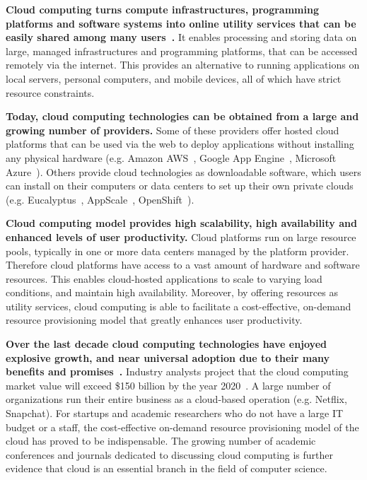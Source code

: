 \textbf{Cloud computing turns compute infrastructures, programming platforms and software systems
into online utility services that can be easily shared among many users~\cite{hassan2011demystifying,Mell:2011:SND:2206223}.}
It enables processing and storing data on large, managed infrastructures and 
programming platforms, that can be accessed remotely via the internet. This provides an
alternative to running applications on local servers, personal computers, and mobile devices,
all of which have strict resource constraints. 

\textbf{Today, cloud computing technologies can be obtained from a large and growing number of providers.}
Some of these providers offer hosted cloud platforms that can be used
via the web to deploy applications without installing any physical hardware 
(e.g. Amazon AWS~\cite{amazon-aws-web}, Google App Engine~\cite{gae}, Microsoft Azure~\cite{azure-web}). Others
provide cloud technologies as downloadable software, which users can install
on their computers or data centers to set up their own private clouds 
(e.g. Eucalyptus~\cite{eucalyptus09}, AppScale~\cite{6488671}, OpenShift~\cite{openshift}).

\textbf{Cloud computing model provides high scalability, high availability and enhanced levels of 
user productivity.} Cloud platforms run on large resource pools, typically in one or more
data centers managed by the platform provider. Therefore cloud platforms have access to a vast
amount of hardware and software resources. This enables cloud-hosted applications
to scale to varying load conditions, and maintain high availability. Moreover, by offering resources
as utility services, cloud computing is able to facilitate a cost-effective, on-demand
resource provisioning model that greatly enhances user productivity. 

\textbf{Over the last decade cloud computing technologies have enjoyed explosive growth, 
and near universal adoption due to their many benefits and 
promises~\cite{Antonopoulos:2010:CCP:1855007,Pinheiro:2014:ACC:2618168.2618188}.} 
Industry analysts project that the cloud computing market value will exceed \$150 billion
by the year 2020~\cite{cloud-growth}.
A large number of organizations
run their entire business as a cloud-based operation (e.g. Netflix, Snapchat). For startups
and academic researchers who do not have a large IT budget or a staff, the cost-effective 
on-demand resource provisioning model of the cloud has proved to be indispensable.
The growing number of academic conferences and journals dedicated to discussing
cloud computing is further evidence that cloud is an essential branch in the field
of computer science.


